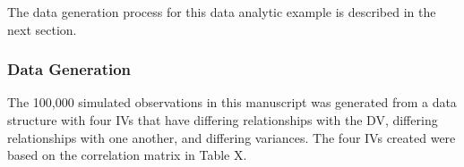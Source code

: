 \documentclass[ShortAfour,times,sageapa]{sagej}
\begin{document}
	The data generation process for this data analytic example is described in the next section.
	
		\subsubsection{Data Generation}
		
	The 100,000 simulated observations in this manuscript was generated from a data structure with four IVs that have differing relationships with the DV, differing relationships with one another, and differing variances.
	The four IVs created were based on the correlation matrix in Table X.
	
%	
%	
\end{document}
